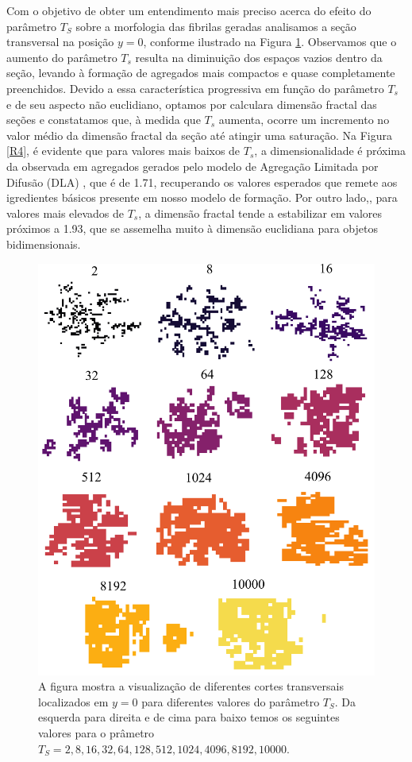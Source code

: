 \documentclass{article}
\begin{document}
    Com o objetivo de obter um entendimento mais preciso acerca do efeito do parâmetro $T_{S}$ sobre a morfologia das 
    fibrilas geradas analisamos a seção transversal na posição \(y=0\), conforme ilustrado na Figura \ref{R3}. Observamos 
    que o aumento do parâmetro \(T_{s}\) resulta na diminuição dos espaços vazios dentro da seção, levando à formação de 
    agregados mais compactos e quase completamente preenchidos. Devido a essa característica progressiva em função do 
    parâmetro \(T_{s}\) e de seu aspecto não euclidiano, optamos por calculara dimensão fractal das seções e constatamos que, à medida que \(T_{s}\) aumenta, ocorre um 
    incremento no valor médio da dimensão fractal da seção até atingir uma saturação. Na Figura \ref{R4}, é evidente 
    que para valores mais baixos de \(T_{s}\), a dimensionalidade é próxima da observada em agregados gerados pelo 
    modelo de Agregação Limitada por Difusão (DLA) \cite{Witten1983}, que é de 1.71, recuperando os valores esperados 
    que remete aos igredientes básicos presente em nosso modelo de formação. Por outro lado,, para valores mais elevados 
    de \(T_{s}\), a dimensão fractal tende a estabilizar em valores próximos a 1.93, que se assemelha muito à dimensão 
    euclidiana para objetos bidimensionais. 

    \begin{figure}[H]
        \centering
        \includegraphics[width=\textwidth]{figures/cs_all.png}
        \caption{A figura mostra a visualização de diferentes cortes transversais localizados em \(y=0\) para diferentes 
        valores do parâmetro $T_{S}$. Da esquerda para direita e de cima para baixo temos os seguintes valores para o 
        prâmetro $T_{S}=2,8,16,32,64,128,512,1024,4096,8192, 10000$.} 
        \label{R3}
    \end{figure}
\end{document}
